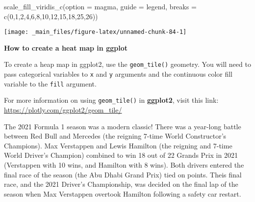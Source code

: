 \documentclass[
]{book}
\newenvironment{Shaded}{\begin{snugshade}}{\end{snugshade}}
\newcommand{\AttributeTok}[1]{\textcolor[rgb]{0.77,0.63,0.00}{#1}}
\newcommand{\DecValTok}[1]{\textcolor[rgb]{0.00,0.00,0.81}{#1}}
\newcommand{\FunctionTok}[1]{\textcolor[rgb]{0.00,0.00,0.00}{#1}}
\newcommand{\NormalTok}[1]{#1}
\newcommand{\StringTok}[1]{\textcolor[rgb]{0.31,0.60,0.02}{#1}}
\begin{document}
\begin{Shaded}
\begin{Highlighting}[]
  \FunctionTok{scale\_fill\_viridis\_c}\NormalTok{(}\AttributeTok{option =} \StringTok{\textquotesingle{}magma\textquotesingle{}}\NormalTok{,}
                       \AttributeTok{guide =} \StringTok{\textquotesingle{}legend\textquotesingle{}}\NormalTok{,}
                       \AttributeTok{breaks =} \FunctionTok{c}\NormalTok{(}\DecValTok{0}\NormalTok{,}\DecValTok{1}\NormalTok{,}\DecValTok{2}\NormalTok{,}\DecValTok{4}\NormalTok{,}\DecValTok{6}\NormalTok{,}\DecValTok{8}\NormalTok{,}\DecValTok{10}\NormalTok{,}\DecValTok{12}\NormalTok{,}\DecValTok{15}\NormalTok{,}\DecValTok{18}\NormalTok{,}\DecValTok{25}\NormalTok{,}\DecValTok{26}\NormalTok{))}
\end{Highlighting}
\end{Shaded}

\begin{center}\texttt{[image: \_main\_files/figure-latex/unnamed-chunk-84-1]} \end{center}

\begin{blackbox}

\begin{center}
\textbf{How to create a heat map in ggplot}

\end{center}

To create a heap map in ggplot2, use the \texttt{geom\_tile()} geometry. You will need to pass categorical variables to \texttt{x} and \texttt{y} arguments and the continuous color fill variable to the \texttt{fill} argument.

For more information on using \texttt{geom\_tile()} in \textbf{ggplot2}, visit this link: \url{https://plotly.com/ggplot2/geom_tile/}

\end{blackbox}

The 2021 Formula 1 season was a modern classic! There was a year-long battle between Red Bull and Mercedes (the reigning 7-time World Constructor's Champions). Max Verstappen and Lewis Hamilton (the reigning and 7-time World Driver's Champion) combined to win 18 out of 22 Grands Prix in 2021 (Verstappen with 10 wins, and Hamilton with 8 wins). Both drivers entered the final race of the season (the Abu Dhabi Grand Prix) tied on points. Theis final race, and the 2021 Driver's Championship, was decided on the final lap of the season when Max Verstappen overtook Hamilton following a safety car restart.
\end{document}
